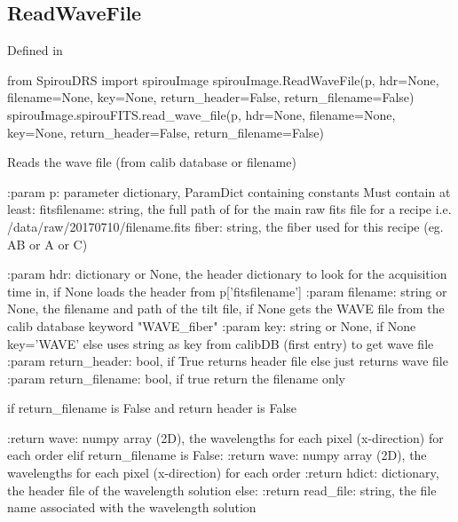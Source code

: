 \noindent\begin{minipage}{\textwidth}
\subsection{ReadWaveFile}

Defined in \spirouImage{}

\begin{pythonbox}
from SpirouDRS import spirouImage
spirouImage.ReadWaveFile(p, hdr=None, filename=None, key=None, return_header=False,
                         return_filename=False)
spirouImage.spirouFITS.read_wave_file(p, hdr=None, filename=None, key=None, return_header=False,
                                      return_filename=False)
\end{pythonbox}

\begin{pythondocstring}
Reads the wave file (from calib database or filename)

:param p: parameter dictionary, ParamDict containing constants
    Must contain at least:
            fitsfilename: string, the full path of for the main raw fits
                          file for a recipe
                          i.e. /data/raw/20170710/filename.fits
            fiber: string, the fiber used for this recipe (eg. AB or A or C)

:param hdr: dictionary or None, the header dictionary to look for the
                 acquisition time in, if None loads the header from
                 p['fitsfilename']
:param filename: string or None, the filename and path of the tilt file,
                 if None gets the WAVE file from the calib database
                 keyword "WAVE_{fiber}"
:param key: string or None, if None key='WAVE' else uses string as key
            from calibDB (first entry) to get wave file
:param return_header: bool, if True returns header file else just returns
                      wave file
:param return_filename: bool, if true return the filename only


if return_filename is False and return header is False
                      
    :return wave: numpy array (2D), the wavelengths for each pixel 
                  (x-direction) for each order
elif return_filename is False:
    :return wave: numpy array (2D), the wavelengths for each pixel 
                  (x-direction) for each order
    :return hdict: dictionary, the header file of the wavelength solution
else:
    :return read_file: string, the file name associated with the wavelength
                       solution
\end{pythondocstring}
\end{minipage}

